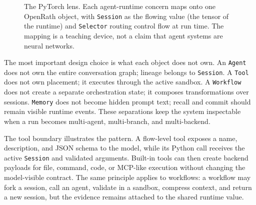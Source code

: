 \documentclass{llmxive}
\begin{document}
\begin{figure}[!htbp]
\centering
{}
\caption{The PyTorch lens. Each agent-runtime concern maps onto one OpenRath
object, with \texttt{Session} as the flowing value (the tensor of the runtime)
and \texttt{Selector} routing control flow at run time. The mapping is a
teaching device, not a claim that agent systems are neural networks.}
\label{fig:pytorch-lens}
\end{figure}

The most important design choice is what each object does not own. An
\texttt{Agent} does not own the entire conversation graph; lineage belongs to
\texttt{Session}. A \texttt{Tool} does not own placement; it executes through
the active sandbox. A \texttt{Workflow} does not create a separate orchestration
state; it composes transformations over sessions. \texttt{Memory} does not
become hidden prompt text; recall and commit should remain visible runtime
events. These separations keep the system inspectable when a run becomes
multi-agent, multi-branch, and multi-backend.

The tool boundary illustrates the pattern. A flow-level tool exposes a name,
description, and JSON schema to the model, while its Python call receives the
active \texttt{Session} and validated arguments. Built-in tools can then create
backend payloads for file, command, code, or MCP-like execution without changing
the model-visible contract. The same principle applies to workflows: a workflow
may fork a session, call an agent, validate in a sandbox, compress context, and
return a new session, but the evidence remains attached to the shared runtime
value.
\end{document}
